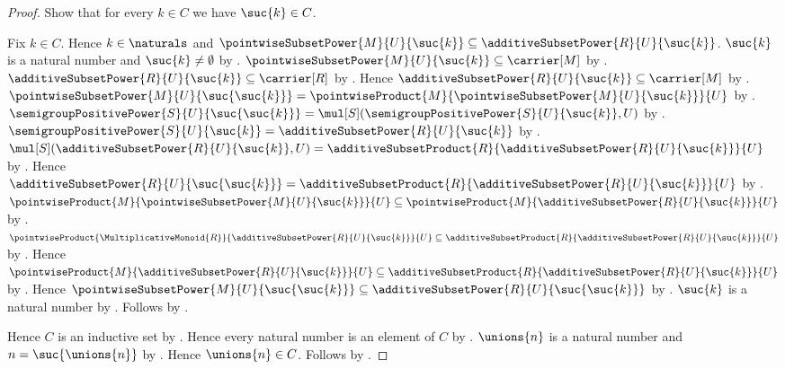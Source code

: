 \begin{proof}
    Show that for every $k\in C$ we have $\suc{k}\in C$.
    \begin{subproof}
        Fix $k\in C$.
        Hence $k\in\naturals$ and
            $\pointwiseSubsetPower{M}{U}{\suc{k}}
                \subseteq\additiveSubsetPower{R}{U}{\suc{k}}$.
        $\suc{k}$ is a natural number and $\suc{k}\neq\emptyset$ by
            .
        $\pointwiseSubsetPower{M}{U}{\suc{k}}
            \subseteq\carrier[M]$ by
            .
        $\additiveSubsetPower{R}{U}{\suc{k}}
            \subseteq\carrier[R]$ by
            .
        Hence $\additiveSubsetPower{R}{U}{\suc{k}}
            \subseteq\carrier[M]$ by \auto.
        $\pointwiseSubsetPower{M}{U}{\suc{\suc{k}}}
            =\pointwiseProduct{M}{
                \pointwiseSubsetPower{M}{U}{\suc{k}}}{U}$ by
            .
        $\semigroupPositivePower{S}{U}{\suc{\suc{k}}}
            =\mul[S](\semigroupPositivePower{S}{U}{\suc{k}},U)$ by
            .
        $\semigroupPositivePower{S}{U}{\suc{k}}
            =\additiveSubsetPower{R}{U}{\suc{k}}$ by
            .
        $\mul[S](\additiveSubsetPower{R}{U}{\suc{k}},U)
            =\additiveSubsetProduct{R}{
                \additiveSubsetPower{R}{U}{\suc{k}}}{U}$ by
            .
        Hence $\additiveSubsetPower{R}{U}{\suc{\suc{k}}}
            =\additiveSubsetProduct{R}{
                \additiveSubsetPower{R}{U}{\suc{k}}}{U}$ by
            .
        $\pointwiseProduct{M}{
                \pointwiseSubsetPower{M}{U}{\suc{k}}}{U}
            \subseteq\pointwiseProduct{M}{
                \additiveSubsetPower{R}{U}{\suc{k}}}{U}$ by
            .
        $\pointwiseProduct{\MultiplicativeMonoid{R}}{
                \additiveSubsetPower{R}{U}{\suc{k}}}{U}
            \subseteq\additiveSubsetProduct{R}{
                \additiveSubsetPower{R}{U}{\suc{k}}}{U}$ by
            .
        Hence $\pointwiseProduct{M}{
                \additiveSubsetPower{R}{U}{\suc{k}}}{U}
            \subseteq\additiveSubsetProduct{R}{
                \additiveSubsetPower{R}{U}{\suc{k}}}{U}$ by
            \auto.
        Hence $\pointwiseSubsetPower{M}{U}{\suc{\suc{k}}}
            \subseteq\additiveSubsetPower{R}{U}{\suc{\suc{k}}}$ by
            .
        $\suc{k}$ is a natural number by .
        Follows by \auto.
    \end{subproof}
    Hence $C$ is an inductive set by .
    Hence every natural number is an element of $C$ by
        .
    $\unions{n}$ is a natural number and $n=\suc{\unions{n}}$ by
        .
    Hence $\unions{n}\in C$.
    Follows by \auto.
\end{proof}

